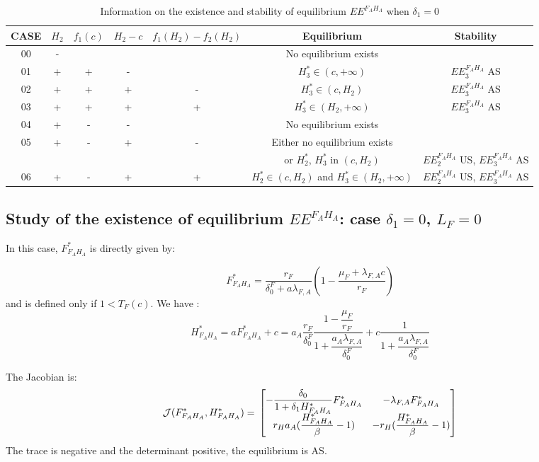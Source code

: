 \documentclass{article}
\newcommand{\lfa}{\lambda_{F, A}}
\newcommand{\df}{\delta_0^F}
\begin{document}
\begin{appendices}
\begin{table}[!ht]
\centering
\caption{Information on the existence and stability of equilibrium $EE^{F_AH_A}$ when $\delta_1 = 0$}
\label{modelFAHA:stability endemic, delta1=0}
{\small
\begin{tabular}{c|c|c|c|c|c|c}
CASE & $H_2$ & $f_1(c)$ & $H_2 - c$ & $f_1(H_2) - f_2(H_2)$ & Equilibrium & Stability\\
\hline
00 & - &   &   & & No equilibrium exists & \\
\hline
01 & + & + & - & & $H_3^* \in (c, +\infty)$ &$EE^{F_AH_A}_3$ AS\\
\hline
02 & + & + & + & - & $H_3^* \in (c, H_2)$ & $EE^{F_AH_A}_3$ AS \\
\hline
03 & + & + & + & + & $ H_3^* \in (H_2, +\infty)$ &$EE^{F_AH_A}_3$ AS \\
\hline
04 & + & - & - & & No equilibrium exists & \\
\hline
\multirow{2}{*}{05} & \multirow{2}{*}{+} & \multirow{2}{*}{-} & \multirow{2}{*}{+} & \multirow{2}{*}{-} & Either no equilibrium exists \\
& & & & & or $H_2^*$, $H_3^*$ in $(c, H_2)$ & $EE^{F_AH_A}_2$ US, $EE^{F_AH_A}_3$ AS \\
\hline
06 & + &- & + & + & $H_2^* \in (c, H_2)$ and $H_3^* \in (H_2, + \infty)$ & $EE^{F_AH_A}_2$ US, $EE^{F_AH_A}_3$ AS
\end{tabular}}
\end{table} 

\subsection{Study of the existence of equilibrium $EE^{F_AH_A}$: case $\delta_1 = 0$, $L_F = 0$}

In this case, $F^*_{F_AH_A}$ is directly given by:

\begin{equation*}
F^*_{F_AH_A} = \dfrac{r_F}{\df + a\lfa} \left(1 - \dfrac{\mu_F + \lfa c}{r_F} \right)
\end{equation*}
and is defined only if $1 < T_F(c)$.
We have :
\begin{equation*}
H^*_{F_AH_A} = aF^*_{F_AH_A} + c = a_A \dfrac{r_F}{\df} \dfrac{1 - \dfrac{\mu_F}{r_F}}{1 + \dfrac{a_A \lfa}{\df}} + c \dfrac{1}{1 + \dfrac{a_A \lfa}{\df}}
\end{equation*}

The Jacobian is:
\begin{equation*}
\mathcal{J}(F^*_{F_AH_A}, H^*_{F_AH_A}) = \\ \begin{bmatrix}
- \dfrac{\delta_0}{1 + \delta_1 H^*_{F_AH_A}}F^*_{F_AH_A} & -\lfa F^*_{F_AH_A} \\
r_H a_A (\dfrac{H^*_{F_AH_A}}{\beta} - 1) & -r_H(\dfrac{H^*_{F_AH_A}}{\beta} - 1)
\end{bmatrix}
\end{equation*}
The trace is negative and the determinant positive, the equilibrium is AS.


\end{appendices}
\end{document}
